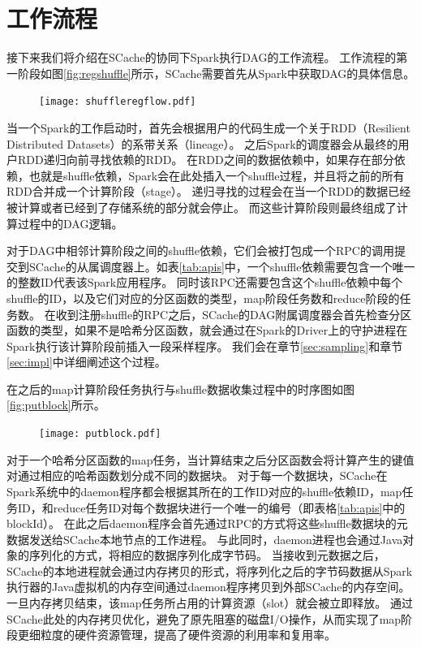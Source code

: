 \section{工作流程}

接下来我们将介绍在SCache的协同下Spark执行DAG的工作流程。
工作流程的第一阶段如图\ref{fig:regshuffle}所示，SCache需要首先从Spark中获取DAG的具体信息。

\begin{figure}[!htp]
	\centering
	\texttt{[image: shuffleregflow.pdf]}
\end{figure}

当一个Spark的工作启动时，首先会根据用户的代码生成一个关于RDD（Resilient Distributed Datasets）的系带关系（lineage）。
之后Spark的调度器会从最终的用户RDD递归向前寻找依赖的RDD。
在RDD之间的数据依赖中，如果存在部分依赖，也就是shuffle依赖，Spark会在此处插入一个shuffle过程，并且将之前的所有RDD合并成一个计算阶段（stage）。
递归寻找的过程会在当一个RDD的数据已经被计算或者已经到了存储系统的部分就会停止。
而这些计算阶段则最终组成了计算过程中的DAG逻辑。

对于DAG中相邻计算阶段之间的shuffle依赖，它们会被打包成一个RPC的调用提交到SCache的从属调度器上。如表\ref{tab:apis}中，一个shuffle依赖需要包含一个唯一的整数ID代表该Spark应用程序。
同时该RPC还需要包含这个shuffle依赖中每个shuffle的ID，以及它们对应的分区函数的类型，map阶段任务数和reduce阶段的任务数。
在收到注册shuffle的RPC之后，SCache的DAG附属调度器会首先检查分区函数的类型，如果不是哈希分区函数，就会通过在Spark的Driver上的守护进程在Spark执行该计算阶段前插入一段采样程序。
我们会在章节\ref{sec:sampling}和章节\ref{sec:impl}中详细阐述这个过程。

在之后的map计算阶段任务执行与shuffle数据收集过程中的时序图如图\ref{fig:putblock}所示。

\begin{figure}[!htp]
	\centering
	\texttt{[image: putblock.pdf]}
\end{figure}

对于一个哈希分区函数的map任务，当计算结束之后分区函数会将计算产生的键值对通过相应的哈希函数划分成不同的数据块。
对于每一个数据块，SCache在Spark系统中的daemon程序都会根据其所在的工作ID对应的shuffle依赖ID，map任务ID，和reduce任务ID对每个数据块进行一个唯一的编号（即表格\ref{tab:apis}中的blockId）。
在此之后daemon程序会首先通过RPC的方式将这些shuffle数据块的元数据发送给SCache本地节点的工作进程。
与此同时，daemon进程也会通过Java对象的序列化的方式，将相应的数据序列化成字节码。
当接收到元数据之后，SCache的本地进程就会通过内存拷贝的形式，将序列化之后的字节码数据从Spark执行器的Java虚拟机的内存空间通过daemon程序拷贝到外部SCache的内存空间。
一旦内存拷贝结束，该map任务所占用的计算资源（slot）就会被立即释放。
通过SCache此处的内存拷贝优化，避免了原先阻塞的磁盘I/O操作，从而实现了map阶段更细粒度的硬件资源管理，提高了硬件资源的利用率和复用率。

